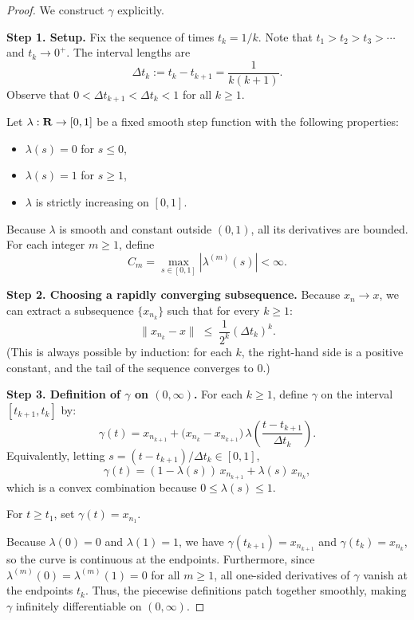 \begin{proof}
  We construct $\gamma$ explicitly.
  
  \textbf{Step 1. Setup.}
  Fix the sequence of times $t_k = 1/k$.
  Note that $t_1 > t_2 > t_3 > \cdots$ and $t_k \to 0^+$.
  The interval lengths are
  $$%
    \Delta t_k := t_k - t_{k+1} = \frac{1}{k(k+1)}.
    $$%
  Observe that $0 < \Delta t_{k+1} < \Delta t_k < 1$ for all $k \ge 1$.
  
  Let $\lambda: \mathbf{R} \to [0,1]$ be a fixed smooth step function with the following properties:
  \begin{itemize}
    \item $\lambda(s)=0$ for $s \le 0$,
    \item $\lambda(s)=1$ for $s \ge 1$,
    \item $\lambda$ is strictly increasing on $[0,1]$.
  \end{itemize}
  Because $\lambda$ is smooth and constant outside $(0,1)$,
  all its derivatives are bounded.
  For each integer $m \ge 1$, define
  $$%
    C_m = \max_{s \in [0,1]} |\lambda^{(m)}(s)| < \infty.
    $$%
  
  \textbf{Step 2. Choosing a rapidly converging subsequence.}
  Because $x_n \to x$,
  we can extract a subsequence $\{x_{n_k}\}$ such that for every $k \ge 1$:
  \begin{equation} \tag{1}
    \|x_{n_k} - x\| \;\le\; \frac{1}{2^k}(\Delta t_k)^k.
  \end{equation}
  (This is always possible by induction:
  for each $k$,
  the right-hand side is a positive constant,
  and the tail of the sequence converges to $0$.)
  
  \textbf{Step 3. Definition of $\gamma$ on $(0,\infty)$.}
  For each $k \ge 1$, define $\gamma$ on the interval $[t_{k+1}, t_k]$ by:
  \begin{equation} \tag{2}
    \gamma(t)=x_{n_{k+1}} + \bigl(x_{n_k}-x_{n_{k+1}}\bigr)\,
    \lambda\!\left(\frac{t-t_{k+1}}{\Delta t_k}\right).
  \end{equation}
  Equivalently,
  letting $s = (t-t_{k+1})/\Delta t_k \in [0,1]$,
  $$%
    \gamma(t) = (1-\lambda(s))\,x_{n_{k+1}} + \lambda(s)\,x_{n_k},
    $$%
  which is a convex combination because $0 \le \lambda(s) \le 1$.
  
  For $t \ge t_1$, set $\gamma(t)=x_{n_1}$.
  
  Because $\lambda(0)=0$ and $\lambda(1)=1$,
  we have $\gamma(t_{k+1}) = x_{n_{k+1}}$ and $\gamma(t_k) = x_{n_k}$,
  so the curve is continuous at the endpoints.
  Furthermore,
  since $\lambda^{(m)}(0) = \lambda^{(m)}(1) = 0$ for all $m \ge 1$,
  all one-sided derivatives of $\gamma$ vanish at the endpoints $t_k$.
  Thus,
  the piecewise definitions patch together smoothly,
  making $\gamma$ infinitely differentiable on $(0,\infty)$.
  

\end{proof}
